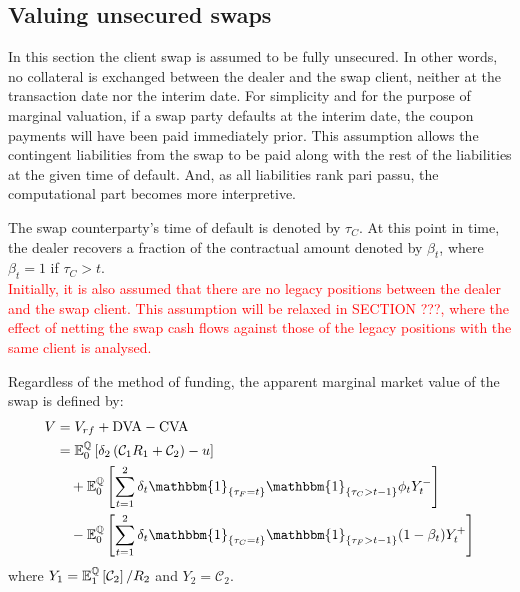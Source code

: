 \documentclass[main.tex]{subfiles}
\begin{document}
    \subsection{Valuing unsecured swaps}
        In this section the client swap is assumed to be fully unsecured.
        In other words, no collateral is exchanged between the dealer and the swap client, 
        neither at the transaction date nor the interim date.
        For simplicity and for the purpose of marginal valuation,
        if a swap party defaults at the interim date, the coupon payments will have been paid immediately prior.
        This assumption allows the contingent liabilities from the swap to be paid along with the rest of the liabilities at the given time of default.
        And, as all liabilities rank pari passu, the computational part becomes more interpretive.

        The swap counterparty's time of default is denoted by $\tau_{C}$.
        At this point in time, the dealer recovers a fraction of the contractual amount denoted by $\beta_{t}$, where $\beta_{t} = 1$ if $\tau_{C}>t$.
        \\
        \textcolor{red}{Initially, it is also assumed that there are no legacy positions between the dealer and the swap client.
        This assumption will be relaxed in SECTION ???, where the effect of netting the swap cash flows against those of the legacy positions with the same client is analysed.}

        Regardless of the method of funding, the apparent marginal market value of the swap is defined by:
        \begin{align}
            V &= V_{rf} + \DVA/ - \CVA/
            \nonumber
            \\
            &=
            \mathbb{E}_{0}^{\rnmeasure}\left[
                \delta_2 \left(\mathcal{C}_{1} R_{1} + \mathcal{C}_{2}\right)
                - u
            \right]
            \nonumber
            \\
            &\quad +
            \mathbb{E}_{0}^{\rnmeasure}\left[
                \sum_{t=1}^{2} \delta_{t} \mathbbm{1}_{\{\tau_{F} = t\}}\mathbbm{1}_{\{\tau_{C}>t-1\}} \phi_t Y_{t}^{-} 
            \right]
            \nonumber
            \\
            &\quad -
            \mathbb{E}_{0}^{\rnmeasure}\left[
                \sum_{t=1}^{2} \delta_{t} \mathbbm{1}_{\{\tau_{C} = t\}}\mathbbm{1}_{\{\tau_{F}>t-1\}} (1-\beta_t) Y_{t}^{+} 
            \right]
            \label{eqn:swap-value-multi-period}
        \end{align}
        where $Y_{1} = \mathbb{E}_{1}^{\mathbb{Q}}\left[\mathcal{C}_{2}\right]/R_{2}$ and $Y_{2} = \mathcal{C}_{2}$.
\end{document}
